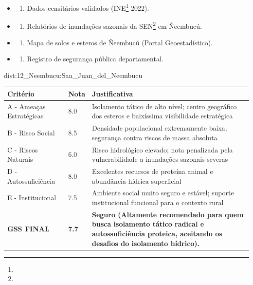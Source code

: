{\begin{itemize}
\tightlist
\item
  \begin{enumerate}
  \def\labelenumi{\arabic{enumi})}
  \tightlist
  \item
    Dados censitários validados (INE\footnote{\fineINE} 2022).
  \end{enumerate}
\item
  \begin{enumerate}
  \def\labelenumi{\arabic{enumi})}
  \setcounter{enumi}{1}
  \tightlist
  \item
    Relatórios de inundações sazonais da SEN\footnote{\fineSEN} em Ñeembucú.
  \end{enumerate}
\item
  \begin{enumerate}
  \def\labelenumi{\arabic{enumi})}
  \setcounter{enumi}{2}
  \tightlist
  \item
    Mapa de solos e esteros de Ñeembucú (Portal Geoestadístico).
  \end{enumerate}
\item
  \begin{enumerate}
  \def\labelenumi{\arabic{enumi})}
  \setcounter{enumi}{3}
  \tightlist
  \item
    Registro de segurança pública departamental.
  \end{enumerate}
\end{itemize}}{dist:12_Neembucu:San_Juan_del_Neembucu}
\begin{table}[ht!]
\small \begin{tabular}{p{3.0cm}p{0.8cm}p{6.0cm}} \toprule
\textbf{Critério} & \textbf{Nota} & \textbf{Justificativa} \\ \midrule
A - Ameaças Estratégicas & 8.0 & Isolamento tático de alto nível; centro geográfico dos esteros e baixíssima visibilidade estratégica \\
B - Risco Social & 8.5 & Densidade populacional extremamente baixa; segurança contra riscos de massa absoluta \\
C - Riscos Naturais & 6.0 & Risco hidrológico elevado; nota penalizada pela vulnerabilidade a inundações sazonais severas \\
D - Autossuficiência & 8.0 & Excelentes recursos de proteína animal e abundância hídrica superficial \\
E - Institucional & 7.5 & Ambiente social muito seguro e estável; suporte institucional funcional para o contexto rural \\
\midrule \textbf{GSS FINAL} & \textbf{7.7} & \textbf{Seguro (Altamente recomendado para quem busca isolamento tático radical e autossuficiência proteica, aceitando os desafios do isolamento hídrico).} \\ \bottomrule \end{tabular}
\end{table}
